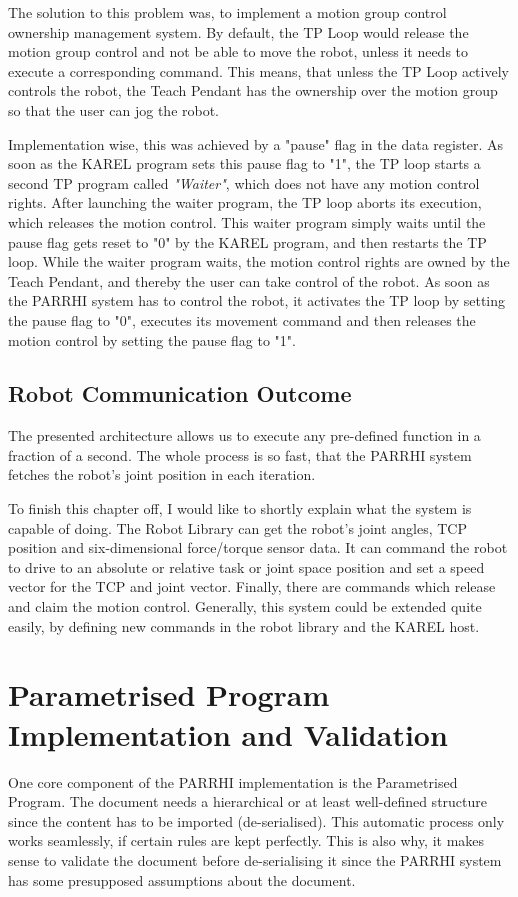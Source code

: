 The solution to this problem was, to implement a motion group control ownership management system. By default, the TP Loop would release the motion group control and not be able to move the robot, unless it needs to execute a corresponding command. This means, that unless the TP Loop actively controls the robot, the Teach Pendant has the ownership over the motion group so that the user can jog the robot.

Implementation wise, this was achieved by a "pause" flag in the data register. As soon as the KAREL program sets this pause flag to "1", the TP loop starts a second TP program called \textit{"Waiter"}, which does not have any motion control rights. After launching the waiter program, the TP loop aborts its execution, which releases the motion control. This waiter program simply waits until the pause flag gets reset to "0" by the KAREL program, and then restarts the TP loop. While the waiter program waits, the motion control rights are owned by the Teach Pendant, and thereby the user can take control of the robot. As soon as the PARRHI system has to control the robot, it activates the TP loop by setting the pause flag to "0", executes its movement command and then releases the motion control by setting the pause flag to "1".

\subsection{Robot Communication Outcome}

The presented architecture allows us to execute any pre-defined function in a fraction of a second. The whole process is so fast, that the PARRHI system fetches the robot's joint position in each iteration.

To finish this chapter off, I would like to shortly explain what the system is capable of doing. The Robot Library can get the robot's joint angles, TCP position and six-dimensional force/torque sensor data. It can command the robot to drive to an absolute or relative task or joint space position and set a speed vector for the TCP and joint vector. Finally, there are commands which release and claim the motion control. Generally, this system could be extended quite easily, by defining new commands in the robot library and the KAREL host.

\section{Parametrised Program Implementation and Validation}
One core component of the PARRHI implementation is the Parametrised Program. The document needs a hierarchical or at least well-defined structure since the content has to be imported (de-serialised). This automatic process only works seamlessly, if certain rules are kept perfectly. This is also why, it makes sense to validate the document before de-serialising it since the PARRHI system has some presupposed assumptions about the document.  

